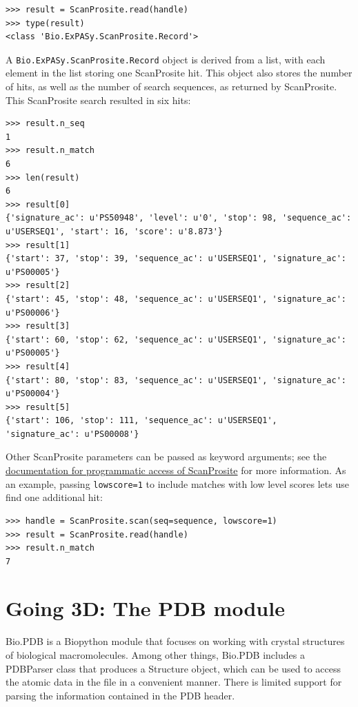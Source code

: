 \documentclass{report}
\begin{document}
\begin{verbatim}
>>> result = ScanProsite.read(handle)
>>> type(result)
<class 'Bio.ExPASy.ScanProsite.Record'>
\end{verbatim}

A \verb+Bio.ExPASy.ScanProsite.Record+ object is derived from a list, with each element in the list storing one ScanProsite hit. This object also stores the number of hits, as well as the number of search sequences, as returned by ScanProsite. This ScanProsite search resulted in six hits:

\begin{verbatim}
>>> result.n_seq
1
>>> result.n_match
6
>>> len(result)
6
>>> result[0]
{'signature_ac': u'PS50948', 'level': u'0', 'stop': 98, 'sequence_ac': u'USERSEQ1', 'start': 16, 'score': u'8.873'}
>>> result[1]
{'start': 37, 'stop': 39, 'sequence_ac': u'USERSEQ1', 'signature_ac': u'PS00005'}
>>> result[2]
{'start': 45, 'stop': 48, 'sequence_ac': u'USERSEQ1', 'signature_ac': u'PS00006'}
>>> result[3]
{'start': 60, 'stop': 62, 'sequence_ac': u'USERSEQ1', 'signature_ac': u'PS00005'}
>>> result[4]
{'start': 80, 'stop': 83, 'sequence_ac': u'USERSEQ1', 'signature_ac': u'PS00004'}
>>> result[5]
{'start': 106, 'stop': 111, 'sequence_ac': u'USERSEQ1', 'signature_ac': u'PS00008'}
\end{verbatim}

Other ScanProsite parameters can be passed as keyword arguments; see the \href{http://www.expasy.org/tools/scanprosite/ScanPrositeREST.html}{documentation for programmatic access of ScanProsite} for more information. As an example, passing \verb+lowscore=1+ to include matches with low level scores lets use find one additional hit:

\begin{verbatim}
>>> handle = ScanProsite.scan(seq=sequence, lowscore=1)
>>> result = ScanProsite.read(handle)
>>> result.n_match
7
\end{verbatim}

\chapter{Going 3D: The PDB module}

Bio.PDB is a Biopython module that focuses on working with crystal structures of biological macromolecules. Among other things, Bio.PDB includes a PDBParser class that produces a Structure object, which can be used to access the atomic data in the file in a convenient manner. There is limited support for parsing the information contained in the PDB header.
\end{document}
